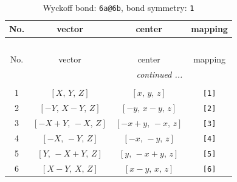 \documentclass[fleqn,8pt]{jsarticle}
\begin{document}
\begin{longtable}{cccc}
\caption{Wyckoff bond: {\tt 6a@6b}, bond symmetry: {\tt 1}}
 \\
 \hline \hline
No. & vector & center & mapping \\ \hline \endfirsthead

\multicolumn{3}{l}{\tablename\ \thetable{}} \\
 \hline \hline
No. & vector & center & mapping \\ \hline \endhead

 \hline \hline
\multicolumn{3}{r}{\footnotesize\it continued ...} \\ \endfoot

 \hline \hline
\multicolumn{3}{r}{} \\ \endlastfoot

1 & $\left[ X,\, Y,\, Z \right]$ & $\left[ x,\, y,\, z \right]$ & {\tt [1]} \\ \hline
2 & $\left[ - Y,\, X - Y,\, Z \right]$ & $\left[ - y,\, x - y,\, z \right]$ & {\tt [2]} \\ \hline
3 & $\left[ - X + Y,\, - X,\, Z \right]$ & $\left[ - x + y,\, - x,\, z \right]$ & {\tt [3]} \\ \hline
4 & $\left[ - X,\, - Y,\, Z \right]$ & $\left[ - x,\, - y,\, z \right]$ & {\tt [4]} \\ \hline
5 & $\left[ Y,\, - X + Y,\, Z \right]$ & $\left[ y,\, - x + y,\, z \right]$ & {\tt [5]} \\ \hline
6 & $\left[ X - Y,\, X,\, Z \right]$ & $\left[ x - y,\, x,\, z \right]$ & {\tt [6]} \\
\end{longtable}
\end{document}
